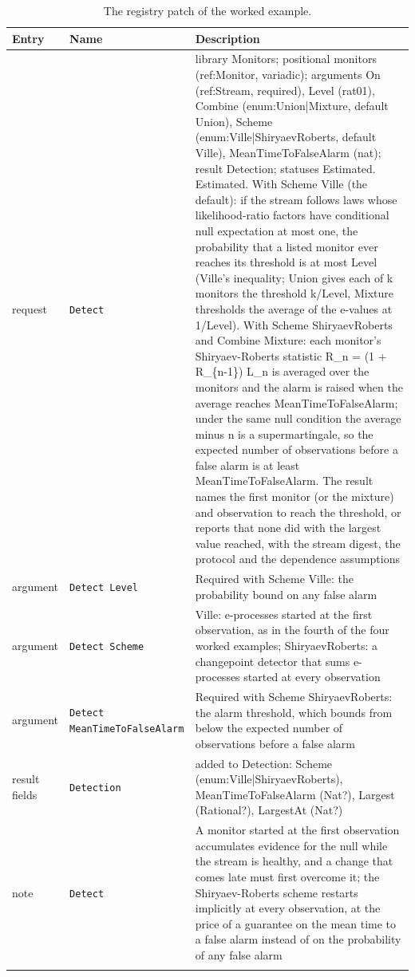 \documentclass[11pt]{article}
\newcommand{\code}[1]{\texttt{#1}}
\theoremstyle{definition}
\theoremstyle{plain}
\begin{document}
\begin{footnotesize}
\begin{longtable}{>{\raggedright\arraybackslash}p{1.9cm}>{\raggedright\arraybackslash}p{3.6cm}>{\raggedright\arraybackslash}p{8.7cm}}
\toprule
Entry & Name & Description\\
\midrule
\endhead
request & \code{Detect} & library Monitors; positional monitors (ref:\allowbreak{}Monitor, variadic); arguments On (ref:\allowbreak{}Stream, required), Level (rat01), Combine (enum:\allowbreak{}Union|\allowbreak{}Mixture, default Union), Scheme (enum:\allowbreak{}Ville|\allowbreak{}ShiryaevRoberts, default Ville), MeanTimeToFalseAlarm (nat); result Detection; statuses Estimated. Estimated.  With Scheme Ville (the default):\allowbreak{} if the stream follows laws whose likelihood-ratio factors have conditional null expectation at most one, the probability that a listed monitor ever reaches its threshold is at most Level (Ville's inequality; Union gives each of k monitors the threshold k/Level, Mixture thresholds the average of the e-values at 1/Level).  With Scheme ShiryaevRoberts and Combine Mixture:\allowbreak{} each monitor's Shiryaev-Roberts statistic R\_n = (1 + R\_\{n-1\}) L\_n is averaged over the monitors and the alarm is raised when the average reaches MeanTimeToFalseAlarm; under the same null condition the average minus n is a supermartingale, so the expected number of observations before a false alarm is at least MeanTimeToFalseAlarm.  The result names the first monitor (or the mixture) and observation to reach the threshold, or reports that none did with the largest value reached, with the stream digest, the protocol and the dependence assumptions\\
argument & \code{Detect Level} & Required with Scheme Ville:\allowbreak{} the probability bound on any false alarm\\
argument & \code{Detect Scheme} & Ville:\allowbreak{} e-processes started at the first observation, as in the fourth of the four worked examples; ShiryaevRoberts:\allowbreak{} a changepoint detector that sums e-processes started at every observation\\
argument & \code{Detect MeanTimeToFalseAlarm} & Required with Scheme ShiryaevRoberts:\allowbreak{} the alarm threshold, which bounds from below the expected number of observations before a false alarm\\
result fields & \code{Detection} & added to Detection:\allowbreak{} Scheme (enum:\allowbreak{}Ville|\allowbreak{}ShiryaevRoberts), MeanTimeToFalseAlarm (Nat?), Largest (Rational?), LargestAt (Nat?)\\
note & \code{Detect} & A monitor started at the first observation accumulates evidence for the null while the stream is healthy, and a change that comes late must first overcome it; the Shiryaev-Roberts scheme restarts implicitly at every observation, at the price of a guarantee on the mean time to a false alarm instead of on the probability of any false alarm\\
\bottomrule
\caption{The registry patch of the worked example.}\label{tab:patch}
\end{longtable}
\end{footnotesize}
\end{document}
